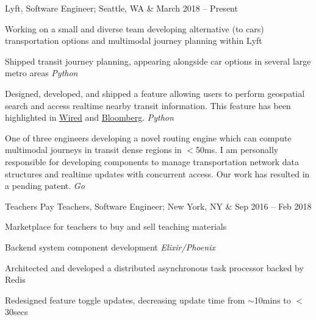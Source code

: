 \documentclass[letterpaper,hidelinks]{scrartcl}
\begin{document}
\begin{list1}

\item \begin{tabular1bold} Lyft, Software Engineer; Seattle, WA & March 2018 -- Present \end{tabular1bold}

  \begin{list2}
  \item Working on a small and diverse team developing alternative (to cars) transportation options and multimodal journey planning within Lyft
  \item Shipped transit journey planning, appearing alongside car options in several large metro areas \hfill\emph{Python}
  \item Designed, developed, and shipped a feature allowing users to perform geospatial search and access realtime nearby transit information. This feature has been highlighted in \href{https://www.wired.com/story/lyft-public-transit-app-zimmer-santa-monica/}{Wired} and \href{https://www.bloomberg.com/news/articles/2019-07-19/lyft-is-adding-new-york-subway-info-to-app-even-as-it-fights-with-the-city}{Bloomberg}. \hfill\emph{Python}
  \item One of three engineers developing a novel routing engine which can compute multimodal journeys in transit dense regions in $<$50ms. I am personally responsible for developing components to manage transportation network data structures and realtime updates with concurrent access. Our work has resulted in a pending patent. \hfill\emph{Go}
  \end{list2}

\item \begin{tabular1bold} Teachers Pay Teachers, Software Engineer; New York, NY & Sep 2016 -- Feb 2018 \end{tabular1bold}

  \begin{list2}
  \item Marketplace for teachers to buy and sell teaching materials

  \item Backend system component development \hfill\emph{Elixir/Phoenix}

    \begin{list3}
    \item Architected and developed a distributed asynchronous task processor backed by Redis
    \item Redesigned feature toggle updates, decreasing update time from $\sim$10mins to $<$30secs
    \end{list3}


\end{list2}
\end{list1}
\end{document}
